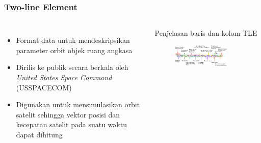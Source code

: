 \documentclass[8pt]{beamer}
\begin{document}
\begin{frame}
  \frametitle{Two-line Element}
  \begin{columns}[c]
      \begin{itemize}
        \item Format data untuk mendeskripsikan parameter orbit objek ruang angkasa
        \item Dirilis ke publik secara berkala oleh \textit{United States Space Command} (USSPACECOM)
        \item Digunakan untuk mensimulasikan orbit satelit sehingga vektor posisi dan kecepatan satelit pada suatu waktu dapat dihitung
      \end{itemize}

          \begin{block}{\center Penjelasan baris dan kolom TLE}
      \begin{figure}
          \includegraphics[width=0.8\textwidth]{figure/tlemeaning.png}
      \end{figure}
          \end{block}
  \end{columns}
\end{frame}
\end{document}
